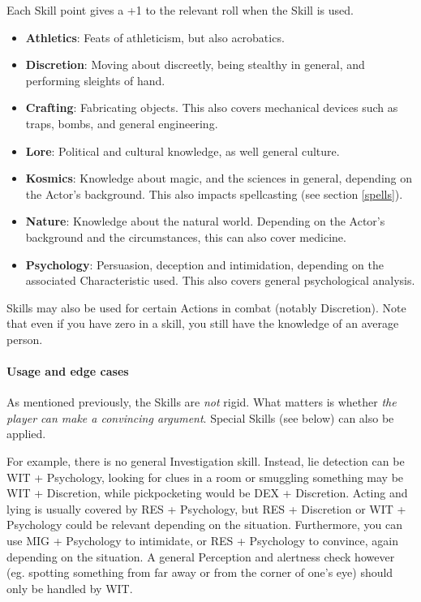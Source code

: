 Each Skill point gives a +1 to the relevant roll when the Skill is used.

\begin{itemize}
    \item \textbf{Athletics}: Feats of athleticism, but also acrobatics.
    \item \textbf{Discretion}: Moving about discreetly, being stealthy in general, and performing sleights of hand.
    \item \textbf{Crafting}: Fabricating objects. This also covers mechanical devices such as traps, bombs, and general engineering.
    \item \textbf{Lore}: Political and cultural knowledge, as well general culture.
    \item \textbf{Kosmics}: Knowledge about magic, and the sciences in general, depending on the Actor's background. This also impacts spellcasting (see section \ref{spells}).
    \item \textbf{Nature}: Knowledge about the natural world. Depending on the Actor's background and the circumstances, this can also cover medicine.
    \item \textbf{Psychology}: Persuasion, deception and intimidation, depending on the associated Characteristic used. This also covers general psychological analysis.
\end{itemize}


Skills may also be used for certain Actions in combat (notably Discretion). Note that even if you have zero in a skill, you still have the knowledge of an average person.


\paragraph{Usage and edge cases}

As mentioned previously, the Skills are \textit{not} rigid. What matters is whether \textit{the player can make a convincing argument}. Special Skills (see below) can also be applied.

For example, there is no general Investigation skill. Instead, lie detection can be WIT + Psychology, looking for clues in a room or smuggling something may be WIT + Discretion, while pickpocketing would be DEX + Discretion. Acting and lying is usually covered by RES + Psychology, but RES + Discretion or WIT + Psychology could be relevant depending on the situation. Furthermore, you can use MIG + Psychology to intimidate, or RES + Psychology to convince, again depending on the situation. A general Perception and alertness check however (eg. spotting something from far away or from the corner of one's eye) should only be handled by WIT.

